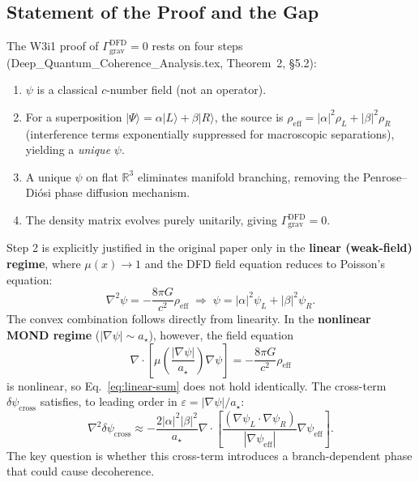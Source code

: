 \documentclass[11pt]{article}
\theoremstyle{definition}
\theoremstyle{remark}
\begin{document}
\subsection{Statement of the Proof and the Gap}

The W3i1 proof of $\Gamma_{\mathrm{grav}}^{\mathrm{DFD}} = 0$ rests on four steps
(Deep\_Quantum\_Coherence\_Analysis.tex, Theorem~2, \S5.2):
\begin{enumerate}
  \item $\psi$ is a classical $c$-number field (not an operator).
  \item For a superposition $|\Psi\rangle = \alpha|L\rangle + \beta|R\rangle$,
        the source is $\rho_{\mathrm{eff}} = |\alpha|^2\rho_L + |\beta|^2\rho_R$
        (interference terms exponentially suppressed for macroscopic separations),
        yielding a \emph{unique} $\psi$.
  \item A unique $\psi$ on flat $\mathbb{R}^3$ eliminates manifold branching,
        removing the Penrose--Di\'osi phase diffusion mechanism.
  \item The density matrix evolves purely unitarily, giving
        $\Gamma_{\mathrm{grav}}^{\mathrm{DFD}} = 0$.
\end{enumerate}

Step 2 is explicitly justified in the original paper only in the
\textbf{linear (weak-field) regime}, where $\mu(x) \to 1$ and the DFD field
equation reduces to Poisson's equation:
\begin{equation}
  \nabla^2\psi = -\frac{8\pi G}{c^2}\rho_{\mathrm{eff}}
  \;\Longrightarrow\;
  \psi = |\alpha|^2\psi_L + |\beta|^2\psi_R. \label{eq:linear-sum}
\end{equation}
The convex combination follows directly from linearity.  In the
\textbf{nonlinear MOND regime} ($|\nabla\psi| \sim a_\star$), however, the
field equation
\begin{equation}
  \nabla\cdot\!\left[\mu\!\left(\frac{|\nabla\psi|}{a_\star}\right)\nabla\psi\right]
  = -\frac{8\pi G}{c^2}\rho_{\mathrm{eff}} \label{eq:nonlinear-psi}
\end{equation}
is nonlinear, so Eq.~\eqref{eq:linear-sum} does not hold identically.
The cross-term $\delta\psi_{\mathrm{cross}}$ satisfies, to leading order in
$\varepsilon = |\nabla\psi|/a_\star$:
\begin{equation}
  \nabla^2\delta\psi_{\mathrm{cross}} \approx
  -\frac{2|\alpha|^2|\beta|^2}{a_\star}
  \nabla\cdot\!\left[\frac{(\nabla\psi_L\cdot\nabla\psi_R)}{|\nabla\psi_{\mathrm{eff}}|}
  \nabla\psi_{\mathrm{eff}}\right]. \label{eq:cross-term}
\end{equation}
The key question is whether this cross-term introduces a branch-dependent phase
that could cause decoherence.
\end{document}
